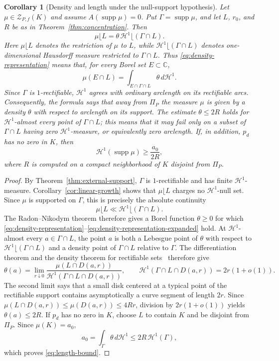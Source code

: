 \documentclass[10pt,a4paper]{amsart}
\newtheorem{corollary}[theorem]{Corollary}
\newcommand{\bC}{\mathbb C}
\newcommand{\supp}{\operatorname{supp}}
\newcommand{\Hone}{\mathcal H^1}
\begin{document}
\begin{corollary}[Density and length under the null-support hypothesis]\label{cor:length}
Let $\mu\in\mathcal Z_{P,f}(K)$ and assume $A(\supp\mu)=0$.  Put
$\Gamma=\supp\mu$, and let $L$, $r_0$, and $R$ be as in
Theorem~\ref{thm:concentration}.  Then
\begin{equation}\label{eq:density-representation}
 \mu\lfloor L=\theta\,\Hone\lfloor(\Gamma\cap L).
\end{equation}
Here $\mu\lfloor L$ denotes the restriction of $\mu$ to $L$, while
$\Hone\lfloor(\Gamma\cap L)$ denotes one-dimensional Hausdorff measure
restricted to $\Gamma\cap L$.  Thus \eqref{eq:density-representation} means
that, for every Borel set $E\subset\bC$,
\begin{equation}\label{eq:density-representation-expanded}
 \mu(E\cap L)=\int_{E\cap\Gamma\cap L}\theta\,d\Hone.
\end{equation}
Since $\Gamma$ is $1$-rectifiable, $\Hone$ agrees with ordinary arclength on
its rectifiable arcs.  Consequently, the formula says that away from
$\Pi_P$ the measure $\mu$ is given by a density $\theta$ with respect to
arclength on its support.  The estimate $\theta\le2R$ holds for
$\Hone$-almost every point of $\Gamma\cap L$; this means that it may fail only
on a subset of $\Gamma\cap L$ having zero $\Hone$-measure, or equivalently
zero arclength.  If, in addition, $p_d$ has no
zero in $K$, then
\begin{equation}\label{eq:length-bound}
 \Hone(\supp\mu)\ge\frac{a_0}{2R},
\end{equation}
where $R$ is computed on a compact neighborhood of $K$ disjoint from
$\Pi_P$.
\end{corollary}

\begin{proof}
By Theorem~\ref{thm:external-support}, $\Gamma$ is $1$-rectifiable and has
finite $\Hone$-measure.  Corollary~\ref{cor:linear-growth} shows that
$\mu\lfloor L$ charges no $\Hone$-null set.  Since $\mu$ is supported on
$\Gamma$, this is precisely the absolute continuity
\[
 \mu\lfloor L\ll\Hone\lfloor(\Gamma\cap L).
\]
The Radon--Nikodym theorem therefore gives a Borel function $\theta\ge0$ for
which \eqref{eq:density-representation}--\eqref{eq:density-representation-expanded}
hold.  At $\Hone$-almost every $a\in\Gamma\cap L$, the point $a$ is both a
Lebesgue point of $\theta$ with respect to
$\Hone\lfloor(\Gamma\cap L)$ and a density point of $\Gamma\cap L$ relative
to $\Gamma$.  The differentiation theorem and the density theorem for
rectifiable sets~\cite[Ch.~16]{Mattila} therefore give
\[
 \theta(a)
 =\lim_{r\downarrow0}
   \frac{\mu(L\cap D(a,r))}
        {\Hone(\Gamma\cap L\cap D(a,r))},
 \qquad
 \Hone(\Gamma\cap L\cap D(a,r))=2r(1+o(1)).
\]
The second limit says that a small disk centered at a typical point of the
rectifiable support contains asymptotically a curve segment of length $2r$.
Since $\mu(L\cap D(a,r))\le\mu(D(a,r))\le4Rr$, division by
$2r(1+o(1))$ yields $\theta(a)\le2R$.  If
$p_d$ has no zero in $K$, choose $L$ to contain $K$ and be disjoint from
$\Pi_P$.  Since $\mu(K)=a_0$,
\[
 a_0=\int_\Gamma\theta\,d\Hone
 \le2R\,\Hone(\Gamma),
\]
which proves \eqref{eq:length-bound}.
\end{proof}
\end{document}
